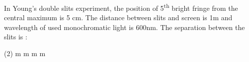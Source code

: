 \item In Young's double slits experiment, the position of 5\textsuperscript{th} bright fringe from the central maximum is 5 cm. The distance between slits and screen is 1m and wavelength of used monochromatic light is 600nm. The separation between the slits is :
    \begin{tasks}(2)
        \textmu m
        \textmu m
        \textmu m
        \textmu m
    \end{tasks}